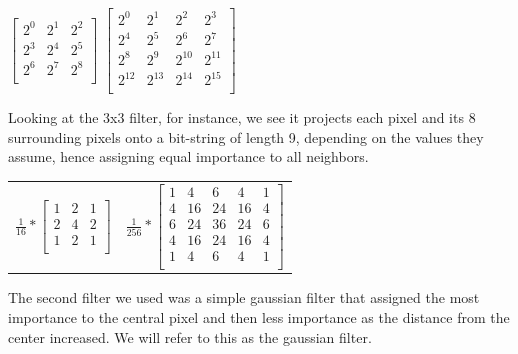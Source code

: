 \documentclass{article} %
\begin{document}
\begin{center}

$\left[
\begin{array}{ccc}
2^0&2^1&2^2\\
2^3&2^4&2^5\\
2^6&2^7&2^8\\
\end{array}
\right]$
$\left[
\begin{array}{cccc}
2^0&2^1&2^2&2^3\\
2^4&2^5&2^6&2^7\\
2^8&2^9&2^{10}&2^{11}\\
2^{12}&2^{13}&2^{14}&2^{15}\\
\end{array}
\right]$

\end{center}

Looking at the 3x3 filter, for instance, we see it projects each pixel and its 8 surrounding pixels onto a bit-string of length 9, depending on the values they assume, hence assigning equal importance to all neighbors. 

\begin{table}
\begin{center}
\begin{tabular}{cc}
$\frac{1}{16}*\left[
\begin{array}{ccc}
1&2&1\\
2&4&2\\
1&2&1\\
\end{array}
\right]$ &

$\frac{1}{256}*\left[
\begin{array}{ccccc}
1&4&6&4&1\\
4&16&24&16&4\\
6&24&36&24&6\\
4&16&24&16&4\\
1&4&6&4&1\\
\end{array}
\right]$ \\
\end{tabular}
\end{center}
\end{table}


The second filter we used was a simple gaussian filter that assigned the most importance to the central pixel and then less importance as the distance from the center increased. We will refer to this as the gaussian filter.
\end{document}
